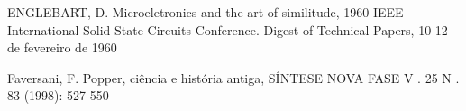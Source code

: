 \documentclass[
12pt,		%
openright,	%
twoside,  %
a4paper,			%
chapter=TITLE,		%
english,			%
french,				%
spanish,			%
brazil				%
]{USPSC-classe/USPSC}
\begin{document}
\begin{flushleft}
\begin{flushleft}
\begin{flushleft}
\begin{flushleft}
\begin{flushleft}
\begin{flushleft}
\begin{flushleft}
\begin{flushleft}
\begin{flushleft}
[ENGLEBART, 2017] ENGLEBART, D. Microeletronics and the art of similitude, 1960 IEEE International Solid-State Circuits Conference. Digest of Technical Papers, 10-12 de fevereiro de 1960
\end{flushleft}


\end{flushleft}


\end{flushleft}


\end{flushleft}


\end{flushleft}


\end{flushleft}


\end{flushleft}


\end{flushleft}


\end{flushleft}


\begin{flushleft}
\begin{flushleft}
\begin{flushleft}
\begin{flushleft}
\begin{flushleft}
\begin{flushleft}
\begin{flushleft}
\begin{flushleft}
\begin{flushleft}
[FAVERSANI, 1998] Faversani, F. Popper, ci\^encia e hist\'oria antiga, S\'INTESE NOVA FASE V . 25 N . 83 (1998): 527-550
\end{flushleft}


\end{flushleft}


\end{flushleft}


\end{flushleft}


\end{flushleft}


\end{flushleft}


\end{flushleft}


\end{flushleft}


\end{flushleft}
\end{document}
